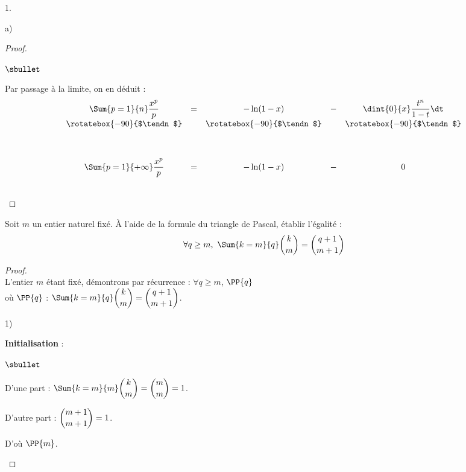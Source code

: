 \documentclass[11pt]{article}%
\begin{document}
\begin{noliste}{1.}
\begin{noliste}{a)}
\begin{proof}
\begin{noliste}{$\sbullet$}
      \item Par passage à la limite, on en déduit :
        \[
        \begin{array}{ccccc}
          \Sum{p = 1}{n} \dfrac{x^{p}}{p} & = & - \ln(1-x) & - &
          \dint{0}{x} \dfrac{t^{n}}{1-t} \dt 
          \\[.2cm]
          \rotatebox{-90}{$\tendn$} & & \rotatebox{-90}{$\tendn$} & &
          \rotatebox{-90}{$\tendn$} 
          \\[1.2cm]
          \Sum{p = 1}{+\infty} \dfrac{x^{p}}{p} & = & - \ln(1-x) & - &
          0
        \end{array}
        \]

      \end{noliste}
      ~\\[-1cm]
    \end{proof}

  \end{noliste}


  \newpage


\item Soit $m$ un entier naturel fixé. À l'aide de la formule du
  triangle de Pascal, établir l'égalité :
  \[
  \forall q \geq m, \ \Sum{k = m}{q} \dbinom{k}{m} = \dbinom{q + 1}{m
    + 1}
  \]

  \begin{proof}~\\
    L'entier $m$ étant fixé, démontrons par récurrence : $\forall
    q \geq m$, $\PP{q}$ \\
    où $\PP{q}$ : $\Sum{k=m}{q} \dbinom{k}{m} = \dbinom{q+1}{m+1}$.
    \begin{noliste}{1)}
    \item {\bf Initialisation} :
      \begin{noliste}{$\sbullet$}
      \item D'une part : $\Sum{k=m}{m} \dbinom{k}{m} = \dbinom{m}{m} =
        1$.
      \item D'autre part : $\dbinom{m+1}{m+1} = 1$.        
      \end{noliste}
      D'où $\PP{m}$.
      

\end{noliste}
\end{proof}
\end{noliste}
\end{document}
